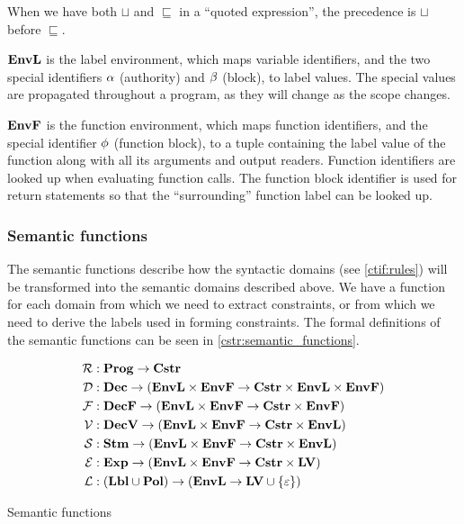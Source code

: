 When we have both $\sqcup$ and $\sqsubseteq$ in a ``quoted expression'', the precedence is $\sqcup$ before $\sqsubseteq$.

$\mathbf{EnvL}$ is the label environment, which maps variable identifiers, and the two special identifiers $\alpha$ (authority) and $\beta$ (block), to label values.
The special values are propagated throughout a program, as they will change as the scope changes.

$\mathbf{EnvF}$ is the function environment, which maps function identifiers, and the special identifier $\phi$ (function block), to a tuple containing the label value of the function along with all its arguments and output readers.
Function identifiers are looked up when evaluating function calls.
The function block identifier is used for return statements so that the ``surrounding'' function label can be looked up.

\subsubsection{Semantic functions}
The semantic functions describe how the syntactic domains (see \cref{ctif:rules}) will be transformed into the semantic domains described above.
We have a function for each domain from which we need to extract constraints, or from which we need to derive the labels used in forming constraints.
The formal definitions of the semantic functions can be seen in \cref{cstr:semantic_functions}.

\begin{table}[H]
\begin{align*}
  \mathcal{R} & : \mathbf{Prog} \rightarrow \mathbf{Cstr} \\
  \mathcal{D} & : \mathbf{Dec} \rightarrow (\mathbf{EnvL} \times \mathbf{EnvF} \rightarrow \mathbf{Cstr} \times \mathbf{EnvL} \times \mathbf{EnvF}) \\
  \mathcal{F} & : \mathbf{DecF} \rightarrow (\mathbf{EnvL} \times \mathbf{EnvF} \rightarrow \mathbf{Cstr} \times \mathbf{EnvF}) \\
  \mathcal{V} & : \mathbf{DecV} \rightarrow (\mathbf{EnvL} \times \mathbf{EnvF} \rightarrow \mathbf{Cstr} \times \mathbf{EnvL}) \\
  \mathcal{S} & : \mathbf{Stm} \rightarrow (\mathbf{EnvL} \times \mathbf{EnvF} \rightarrow \mathbf{Cstr} \times \mathbf{EnvL}) \\
  \mathcal{E} & : \mathbf{Exp} \rightarrow (\mathbf{EnvL} \times \mathbf{EnvF} \rightarrow \mathbf{Cstr} \times \mathbf{LV}) \\
  \mathcal{L} & : (\mathbf{Lbl} \cup \mathbf{Pol}) \rightarrow (\mathbf{EnvL} \rightarrow \mathbf{LV} \cup \{ \varepsilon \})
\end{align*}
\caption{Semantic functions}
\label{cstr:semantic_functions}
\end{table}

